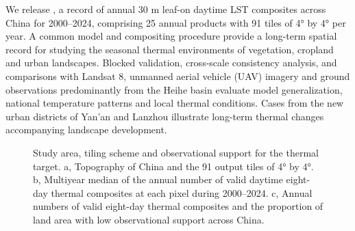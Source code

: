 We release \chinatherm{}, a record of annual 30 m leaf-on daytime LST composites across China for 2000--2024, comprising 25 annual products with 91 tiles of 4° by 4° per year. A common model and compositing procedure provide a long-term spatial record for studying the seasonal thermal environments of vegetation, cropland and urban landscapes. Blocked validation, cross-scale consistency analysis, and comparisons with Landsat 8, unmanned aerial vehicle (UAV) imagery and ground observations predominantly from the Heihe basin evaluate model generalization, national temperature patterns and local thermal conditions. Cases from the new urban districts of Yan'an and Lanzhou illustrate long-term thermal changes accompanying landscape development.

\begin{figure}[H]
\centering
{}
\ReviewFloatBegin
\caption{Study area, tiling scheme and observational support for the thermal target. a, Topography of China and the 91 output tiles of 4° by 4°. b, Multiyear median of the annual number of valid daytime eight-day thermal composites at each pixel during 2000--2024. c, Annual numbers of valid eight-day thermal composites and the proportion of land area with low observational support across China.}
\label{fig:study-area}
\ReviewFloatEnd
\end{figure}
